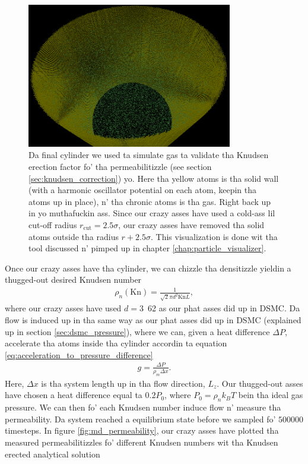 \begin{figure}[h!]
\begin{center}
\includegraphics[width=0.8\textwidth, trim=0cm 0cm 0cm 0cm, clip]{MD/figures/md_cylinder.png}
\end{center}
\caption{Da final cylinder we used ta simulate gas ta validate tha Knudsen erection factor fo' tha permeabilitizzle (see section \ref{sec:knudsen_correction}) yo. Here tha yellow atoms is tha solid wall (with a harmonic oscillator potential on each atom, keepin tha atoms up in place), n' tha chronic atoms is tha gas. Right back up in yo muthafuckin ass. Since our crazy asses have used a cold-ass lil cut-off radius $r_\text{cut}=2.5\sigma$, our crazy asses have removed tha solid atoms outside tha radius $r+2.5\sigma$. This visualization is done wit tha tool discussed n' pimped up in chapter \ref{chap:particle_visualizer}.}
\label{fig:md_cylinder}
\end{figure}
Once our crazy asses have tha cylinder, we can chizzle tha densitizzle yieldin a thugged-out desired Knudsen number
\begin{align}
    \rho_n(\text{Kn}) = \frac{1}{\sqrt 2 \pi d^2 \text{Kn}L},
\end{align}
where our crazy asses have used $d=$\unit{3.62}{\angstrom} as our phat asses did up in DSMC. Da flow is induced up in tha same way as our phat asses did up in DSMC (explained up in section \ref{sec:dsmc_pressure}), where we can, given a heat difference $\Delta P$, accelerate tha atoms inside tha cylinder accordin ta equation \eqref{eq:acceleration_to_pressure_difference}
\begin{align*}
    g = \frac{\Delta P}{\rho_m\Delta x}.
\end{align*}
Here, $\Delta x$ is tha system length up in tha flow direction, $L_z$. Our thugged-out asses have chosen a heat difference equal ta $0.2P_0$, where $P_0=\rho_nk_BT$ bein tha ideal gas pressure. We can then fo' each Knudsen number induce flow n' measure tha permeability. Da system reached a equilibrium state before we sampled fo' $500000$ timesteps. In figure \ref{fig:md_permeability}, our crazy asses have plotted tha measured permeabilitizzles fo' different Knudsen numbers wit tha Knudsen erected analytical solution
